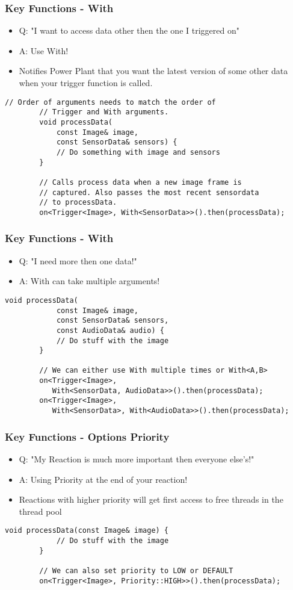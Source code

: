 \documentclass{beamer}
\begin{document}
\begin{frame}[fragile]
	\frametitle {Key Functions - With}
	\begin{itemize}
		\item Q: "I want to access data other then the one I triggered on"
		\item A: Use With!
		\item Notifies Power Plant that you want the latest version of some other data when your trigger function is called.
	\end{itemize}

	\begin{lstlisting}[language=nuclear]
		// Order of arguments needs to match the order of
		// Trigger and With arguments.
		void processData(
		    const Image& image,
		    const SensorData& sensors) {
		    // Do something with image and sensors
		}

		// Calls process data when a new image frame is
		// captured. Also passes the most recent sensordata
		// to processData.
		on<Trigger<Image>, With<SensorData>>().then(processData);
	\end{lstlisting}
\end{frame}

\begin{frame}[fragile]
	\frametitle {Key Functions - With}
	\begin{itemize}
		\item Q: "I need more then one data!"
		\item A: With can take multiple arguments!
	\end{itemize}

	\begin{lstlisting}[language=nuclear]
		void processData(
		    const Image& image,
		    const SensorData& sensors,
		    const AudioData& audio) {
		    // Do stuff with the image
		}

		// We can either use With multiple times or With<A,B>
		on<Trigger<Image>,
		   With<SensorData, AudioData>>().then(processData);
		on<Trigger<Image>,
		   With<SensorData>, With<AudioData>>().then(processData);
	\end{lstlisting}
\end{frame}

\begin{frame}[fragile]
	\frametitle {Key Functions - Options Priority}
	\begin{itemize}
		\item Q: "My Reaction is much more important then everyone else's!"
		\item A: Using Priority at the end of your reaction!
		\item Reactions with higher priority will get first access to free threads in the thread pool
	\end{itemize}

	\begin{lstlisting}[language=nuclear]
		void processData(const Image& image) {
		    // Do stuff with the image
		}

		// We can also set priority to LOW or DEFAULT
		on<Trigger<Image>, Priority::HIGH>>().then(processData);
	\end{lstlisting}
\end{frame}
\end{document}
